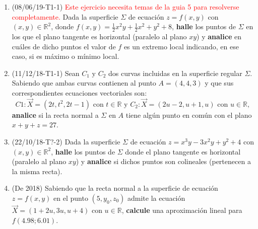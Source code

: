 \documentclass[12pt,a4paper]{article}
\renewcommand{\b}[1]{\textbf{#1}}
\newcommand{\red}[1]{\textcolor{red}{#1}}
\newcommand{\R}{\mathbb{R}}
\newcommand{\y}{\text{ y }}
\begin{document}
\begin{enumerate}
	\item (08/06/19-T1-1) \red{Este ejercicio necesita temas de la guia 5 para resolverse completamente.} Dada la superficie $ \Sigma $ de ecuación $ z = f ( x, y ) $ con $ ( x, y ) \in\R^2$, donde $ f ( x, y ) = \frac{1}{2} x^2 y + \frac{1}{2} x^2 + y^2 + 8 $, \b{halle} los puntos de $ \Sigma $ en los que el plano tangente es horizontal (paralelo al plano $ xy $) y \b{analice} en	cuáles de dicho puntos el valor de $ f $ es un extremo local indicando, en ese caso, si es máximo o mínimo local.
	
	\item (11/12/18-T1-1) Sean $ C_1 \y C_2 $ dos curvas incluidas en la superficie regular $ \Sigma $. Sabiendo que ambas curvas contienen al punto $ A = ( 4, 4, 3 ) $ y que sus correspondientes ecuaciones vectoriales son:
	\[C 1 : \vec{X} = ( 2 t, t^2, 2 t - 1 )\text{ con } t \in\R \y C_2 : \vec{X} = ( 2 u - 2, u + 1, u ) \text{ con } u \in \R,\]
	\b{analice} si la recta normal a $ \Sigma $ en $ A $ tiene algún punto en común con el plano $ x + y + z = 27  $.
	
	\item (22/10/18-T?-2) Dada la superficie $ \Sigma $ de ecuación $ z = x^3y - 3 x^2y + y^2 + 4 $ con $ ( x, y )\in\R^2$, \b{halle} los puntos de $ \Sigma $ donde el plano tangente es horizontal (paralelo al plano $ xy  $) y \b{analice} si dichos puntos son colineales (pertenecen a la misma recta).
	
	\item (De 2018) Sabiendo que la recta normal a la superficie de ecuación $ z = f(x, y) $ en el punto $ (5, y_0, z_0 ) $ admite la ecuación $ \vec{X} = (1 + 2 u, 3 u, u + 4) $ con $ u \in\R $, \b{calcule}  una aproximación lineal para $ f(4.98; 6.01) $.
\end{enumerate}
	
\end{document}
